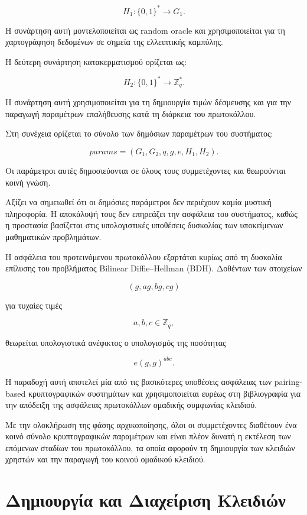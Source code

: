 \documentclass[12pt,a4paper]{report}
\begin{document}
\[
H_1:\{0,1\}^{*}\rightarrow G_1.
\]

Η συνάρτηση αυτή μοντελοποιείται ως random oracle και χρησιμοποιείται για τη χαρτογράφηση δεδομένων σε σημεία της ελλειπτικής καμπύλης.

Η δεύτερη συνάρτηση κατακερματισμού ορίζεται ως:

\[
H_2:\{0,1\}^{*}\rightarrow \mathbb{Z}_q^{*}.
\]

Η συνάρτηση αυτή χρησιμοποιείται για τη δημιουργία τιμών δέσμευσης και για την παραγωγή παραμέτρων επαλήθευσης κατά τη διάρκεια του πρωτοκόλλου.

Στη συνέχεια ορίζεται το σύνολο των δημόσιων παραμέτρων του συστήματος:

\[
params=
(G_1,G_2,q,g,e,H_1,H_2).
\]

Οι παράμετροι αυτές δημοσιεύονται σε όλους τους συμμετέχοντες και θεωρούνται κοινή γνώση.

Αξίζει να σημειωθεί ότι οι δημόσιες παράμετροι δεν περιέχουν καμία μυστική πληροφορία. Η αποκάλυψή τους δεν επηρεάζει την ασφάλεια του συστήματος, καθώς η προστασία βασίζεται στις υπολογιστικές υποθέσεις δυσκολίας των υποκείμενων μαθηματικών προβλημάτων.

Η ασφάλεια του προτεινόμενου πρωτοκόλλου εξαρτάται κυρίως από τη δυσκολία επίλυσης του προβλήματος Bilinear Diffie--Hellman (BDH). Δοθέντων των στοιχείων

\[
(g,a g,b g,c g)
\]

για τυχαίες τιμές

\[
a,b,c \in \mathbb{Z}_q,
\]

θεωρείται υπολογιστικά ανέφικτος ο υπολογισμός της ποσότητας

\[
e(g,g)^{abc}.
\]

Η παραδοχή αυτή αποτελεί μία από τις βασικότερες υποθέσεις ασφάλειας των pairing-based κρυπτογραφικών συστημάτων και χρησιμοποιείται ευρέως στη βιβλιογραφία για την απόδειξη της ασφάλειας πρωτοκόλλων ομαδικής συμφωνίας κλειδιού.

Με την ολοκλήρωση της φάσης αρχικοποίησης, όλοι οι συμμετέχοντες διαθέτουν ένα κοινό σύνολο κρυπτογραφικών παραμέτρων και είναι πλέον δυνατή η εκτέλεση των επόμενων σταδίων του πρωτοκόλλου, τα οποία αφορούν τη δημιουργία των κλειδιών χρηστών και την παραγωγή του κοινού ομαδικού κλειδιού.

\section{Δημιουργία και Διαχείριση Κλειδιών}
\end{document}

